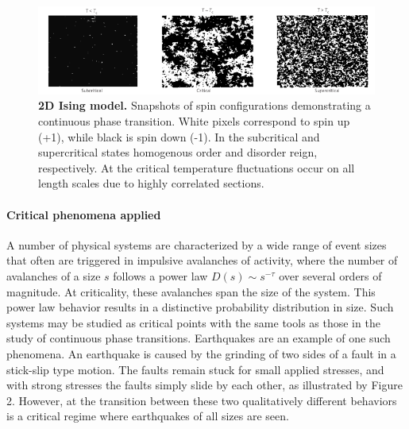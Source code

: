 \documentclass[12pt]{article}
\begin{document}
\begin{figure}      
  \begin{center}    
 \includegraphics[width=1.1\textwidth]{Isingchialvo}    
    \caption{\textbf{2D Ising model.} Snapshots of spin configurations demonstrating a continuous phase transition. White pixels correspond to spin up (+1), while black is spin down (-1). In the subcritical and supercritical states homogenous order and disorder reign, respectively. At the critical temperature fluctuations occur on all length scales due to highly correlated sections. \cite{Chialvo2010a}}   
   \label{Figure::Ising model criticality}   
  \end{center}     
   \end{figure}
   


\paragraph*{Critical phenomena applied}

A number of physical systems are characterized by a wide range of event sizes that often are triggered in impulsive avalanches of activity, where the number of avalanches of a size $s$ follows a power law $ D(s) \sim s^{-\tau} $ over several orders of magnitude. At criticality, these avalanches span the size of the system. This power law behavior results in a distinctive probability distribution in size. Such systems may be studied as critical points with the same tools as those in the study of continuous phase transitions. Earthquakes are an example of one such phenomena\cite{Sethna2011a}. An earthquake is caused by the grinding of two sides of a fault in a stick-slip type motion. The faults remain stuck for small applied stresses, and with strong stresses the faults simply slide by each other, as illustrated by Figure 2. However, at the transition between these two qualitatively different behaviors is a critical regime where earthquakes of all sizes are seen.  
\end{document}
